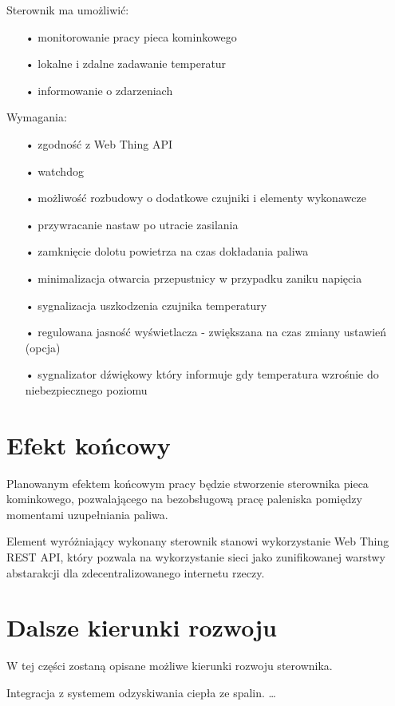 \documentclass[11pt,a4paper]{report}
\begin{document}
 Sterownik ma umożliwić:
 \begin{enumerate}
 \item[•] monitorowanie pracy pieca kominkowego
 \item[•] lokalne i zdalne zadawanie temperatur
 \item[•] informowanie o zdarzeniach
 \end{enumerate}
 
 Wymagania:
 \begin{enumerate}
 \item[•] zgodność z Web Thing API
 \item[•] watchdog
 \item[•] możliwość rozbudowy o dodatkowe czujniki i elementy wykonawcze
 \item[•] przywracanie nastaw po utracie zasilania
 \item[•] zamknięcie dolotu powietrza na czas dokładania paliwa
 \item[•] minimalizacja otwarcia przepustnicy w przypadku zaniku napięcia
 \item[•] sygnalizacja uszkodzenia czujnika temperatury
 \item[•] regulowana jasność wyświetlacza - zwiększana na czas zmiany ustawień (opcja)
 \item[•] sygnalizator dźwiękowy który informuje gdy temperatura wzrośnie do niebezpiecznego poziomu
 \end{enumerate}
 
  
 
 \section{Efekt końcowy}
 Planowanym efektem końcowym pracy będzie stworzenie sterownika pieca kominkowego, pozwalającego na bezobsługową pracę paleniska pomiędzy momentami uzupełniania paliwa.

 Element wyróżniający wykonany sterownik stanowi wykorzystanie Web Thing REST API, który pozwala na wykorzystanie sieci jako zunifikowanej warstwy abstarakcji dla zdecentralizowanego internetu rzeczy.
 
 \section{Dalsze kierunki rozwoju}
 W tej części zostaną opisane możliwe kierunki rozwoju sterownika.
 
 Integracja z systemem odzyskiwania ciepła ze spalin.
 \ldots
 
\end{document}
